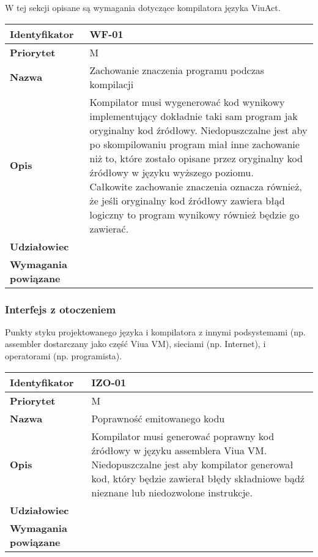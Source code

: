 \documentclass[11pt,oneside,a4paper,titlepage,onecolumn]{article}
\begin{document}
W tej sekcji opisane są wymagania dotyczące kompilatora języka ViuAct.

\vspace{1em}

\begin{tabular}{ | l | l | }
    \hline
    \textbf{Identyfikator} & \parbox[t]{11cm}{WF-01} \\
    \hline
    \textbf{Priorytet} & M \\
    \hline
    \textbf{Nazwa} & Zachowanie znaczenia programu podczas kompilacji \\
    \hline
    \textbf{Opis} & \parbox[t]{11cm}{
        Kompilator musi wygenerować kod wynikowy implementujący dokładnie taki sam program jak oryginalny
        kod źródłowy. Niedopuszczalne jest aby po skompilowaniu program miał inne zachowanie niż to, które
        zostało opisane przez oryginalny kod źródłowy w języku wyższego poziomu.
        \\
        Całkowite zachowanie znaczenia oznacza również, że jeśli oryginalny kod źródłowy zawiera błąd
        logiczny to program wynikowy również będzie go zawierać.
    } \\
    \hline
    \textbf{Udziałowiec} & \phantom{} \\
    \hline
    \textbf{Wymagania powiązane} & \phantom{} \\
    \hline
\end{tabular}

\subsubsection{Interfejs z otoczeniem}

Punkty styku projektowanego języka i kompilatora z innymi podsystemami (np. assembler dostarczany jako
część Viua VM), sieciami (np. Internet), i operatorami (np. programista).

\vspace{1em}

\begin{tabular}{ | l | l | }
    \hline
    \textbf{Identyfikator} & \parbox[t]{11cm}{IZO-01} \\
    \hline
    \textbf{Priorytet} & M \\
    \hline
    \textbf{Nazwa} & Poprawność emitowanego kodu \\
    \hline
    \textbf{Opis} & \parbox[t]{11cm}{
        Kompilator musi generować poprawny kod źródłowy w języku assemblera Viua VM.
        Niedopuszczalne jest aby kompilator generował kod, który będzie zawierał błędy składniowe bądź
        nieznane lub niedozwolone instrukcje.
    } \\
    \hline
    \textbf{Udziałowiec} & \phantom{} \\
    \hline
    \textbf{Wymagania powiązane} & \phantom{} \\
    \hline
\end{tabular}
\end{document}
